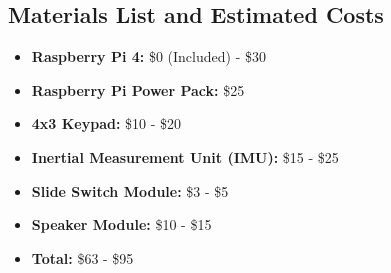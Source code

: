 \documentclass{article}
\begin{document}
\subsection{Materials List and Estimated Costs}
\begin{itemize}
    \item \textbf{Raspberry Pi 4:} \$0 (Included) - \$30
    \item \textbf{Raspberry Pi Power Pack:} \$25
    \item \textbf{4x3 Keypad:} \$10 - \$20
    \item \textbf{Inertial Measurement Unit (IMU):} \$15 - \$25
    \item \textbf{Slide Switch Module:} \$3 - \$5
    \item \textbf{Speaker Module:} \$10 - \$15
    \item \textbf{Total:} \$63 - \$95
\end{itemize}
\end{document}
